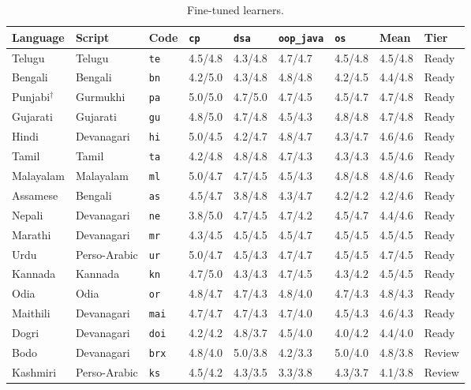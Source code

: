 \documentclass[pdflatex,sn-mathphys-num]{sn-jnl}%
\theoremstyle{thmstyleone}%
\theoremstyle{thmstyletwo}%
\theoremstyle{thmstylethree}%
\begin{document}
\begin{appendices}
\begin{table}[p]
\caption{Fine-tuned learners.}\label{tab:ft-matrix}
\footnotesize
\begin{tabular*}{\textwidth}{@{\extracolsep\fill}lllllllll}
\toprule
Language & Script & Code & \texttt{cp} & \texttt{dsa} & \texttt{oop\_java} & \texttt{os} & Mean & Tier \\
\midrule
Telugu & Telugu & \texttt{te} & 4.5/4.8 & 4.3/4.8 & 4.7/4.7 & 4.5/4.8 & 4.5/4.8 & Ready \\
Bengali & Bengali & \texttt{bn} & 4.2/5.0 & 4.3/4.8 & 4.8/4.8 & 4.2/4.5 & 4.4/4.8 & Ready \\
Punjabi$^\dagger$ & Gurmukhi & \texttt{pa} & 5.0/5.0 & 4.7/5.0 & 4.7/4.5 & 4.5/4.7 & 4.7/4.8 & Ready \\
Gujarati & Gujarati & \texttt{gu} & 4.8/5.0 & 4.7/4.8 & 4.5/4.3 & 4.8/4.8 & 4.7/4.8 & Ready \\
Hindi & Devanagari & \texttt{hi} & 5.0/4.5 & 4.2/4.7 & 4.8/4.7 & 4.3/4.7 & 4.6/4.6 & Ready \\
Tamil & Tamil & \texttt{ta} & 4.2/4.8 & 4.8/4.8 & 4.7/4.3 & 4.3/4.3 & 4.5/4.6 & Ready \\
Malayalam & Malayalam & \texttt{ml} & 5.0/4.7 & 4.7/4.5 & 4.5/4.3 & 4.8/4.8 & 4.8/4.6 & Ready \\
Assamese & Bengali & \texttt{as} & 4.5/4.7 & 3.8/4.8 & 4.3/4.7 & 4.2/4.2 & 4.2/4.6 & Ready \\
Nepali & Devanagari & \texttt{ne} & 3.8/5.0 & 4.7/4.5 & 4.7/4.2 & 4.5/4.7 & 4.4/4.6 & Ready \\
Marathi & Devanagari & \texttt{mr} & 4.3/4.5 & 4.5/4.5 & 4.5/4.7 & 4.5/4.5 & 4.5/4.5 & Ready \\
Urdu & Perso-Arabic & \texttt{ur} & 5.0/4.7 & 4.5/4.3 & 4.7/4.7 & 4.5/4.5 & 4.7/4.5 & Ready \\
Kannada & Kannada & \texttt{kn} & 4.7/5.0 & 4.3/4.3 & 4.7/4.5 & 4.3/4.2 & 4.5/4.5 & Ready \\
Odia & Odia & \texttt{or} & 4.8/4.7 & 4.7/4.3 & 4.8/4.0 & 4.7/4.3 & 4.8/4.3 & Ready \\
Maithili & Devanagari & \texttt{mai} & 4.7/4.7 & 4.7/4.3 & 4.7/4.0 & 4.5/4.3 & 4.6/4.3 & Ready \\
Dogri & Devanagari & \texttt{doi} & 4.2/4.2 & 4.8/3.7 & 4.5/4.0 & 4.0/4.2 & 4.4/4.0 & Ready \\
Bodo & Devanagari & \texttt{brx} & 4.8/4.0 & 5.0/3.8 & 4.2/3.3 & 5.0/4.0 & 4.8/3.8 & Review \\
Kashmiri & Perso-Arabic & \texttt{ks} & 4.5/4.2 & 4.3/3.5 & 3.3/3.8 & 4.3/3.7 & 4.1/3.8 & Review \\

\end{tabular*}
\end{table}
\end{appendices}
\end{document}
